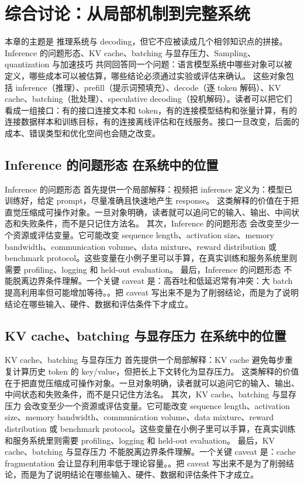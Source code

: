 \documentclass[a4paper]{article}
\begin{document}
\section{综合讨论：从局部机制到完整系统}
本章的主题是 推理系统与 decoding，但它不应被读成几个相邻知识点的拼接。Inference 的问题形态、KV cache、batching 与显存压力、Sampling、quantization 与加速技巧 共同回答同一个问题：语言模型系统中哪些对象可以被定义，哪些成本可以被估算，哪些结论必须通过实验或评估来确认。
这些对象包括 inference（推理）、prefill（提示词预填充）、decode（逐 token 解码）、KV cache、batching（批处理）、speculative decoding（投机解码）。读者可以把它们看成一组接口：有的接口连接文本和 token，有的连接模型结构和张量计算，有的连接数据样本和训练目标，有的连接离线评估和在线服务。接口一旦改变，后面的成本、错误类型和优化空间也会随之改变。
\subsection{Inference 的问题形态 在系统中的位置}
Inference 的问题形态 首先提供一个局部解释：视频把 inference 定义为：模型已训练好，给定 prompt，尽量准确且快速地产生 response。 这类解释的价值在于把直觉压缩成可操作对象。一旦对象明确，读者就可以追问它的输入、输出、中间状态和失败条件，而不是只记住方法名。
其次，Inference 的问题形态 会改变至少一个资源或评估变量。它可能改变 sequence length、activation size、memory bandwidth、communication volume、data mixture、reward distribution 或 benchmark protocol。这些变量在小例子里可以手算，在真实训练和服务系统里则需要 profiling、logging 和 held-out evaluation。
最后，Inference 的问题形态 不能脱离边界条件理解。一个关键 caveat 是：高吞吐和低延迟常有冲突：大 batch 提高利用率但可能增加等待。。把 caveat 写出来不是为了削弱结论，而是为了说明结论在哪些输入、硬件、数据和评估条件下才成立。
\subsection{KV cache、batching 与显存压力 在系统中的位置}
KV cache、batching 与显存压力 首先提供一个局部解释：KV cache 避免每步重复计算历史 token 的 key/value，但把长上下文转化为显存压力。 这类解释的价值在于把直觉压缩成可操作对象。一旦对象明确，读者就可以追问它的输入、输出、中间状态和失败条件，而不是只记住方法名。
其次，KV cache、batching 与显存压力 会改变至少一个资源或评估变量。它可能改变 sequence length、activation size、memory bandwidth、communication volume、data mixture、reward distribution 或 benchmark protocol。这些变量在小例子里可以手算，在真实训练和服务系统里则需要 profiling、logging 和 held-out evaluation。
最后，KV cache、batching 与显存压力 不能脱离边界条件理解。一个关键 caveat 是：cache fragmentation 会让显存利用率低于理论容量。。把 caveat 写出来不是为了削弱结论，而是为了说明结论在哪些输入、硬件、数据和评估条件下才成立。
\end{document}
